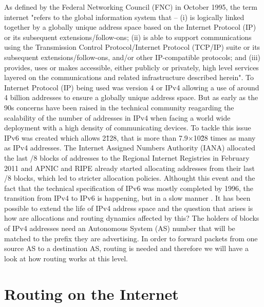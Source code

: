 \documentclass[11pt,a4paper]{scrreprt}
\begin{document}
As defined by the Federal Networking Council (FNC) in October 1995, the term internet "refers to the global information system that -- (i) is logically linked together by a globally unique address space based on the Internet Protocol (IP) or its subsequent extensions/follow-ons; (ii) is able to support communications using the Transmission Control Protocol/Internet Protocol (TCP/IP) suite or its subsequent extensions/follow-ons, and/or other IP-compatible protocols; and (iii) provides, uses or makes accessible, either publicly or privately, high level services layered on the communications and related infrastructure described herein". To Internet Protocol (IP) being used was version 4 or IPv4 allowing a use of around 4 billion addresses to ensure a globally unique address space. 
But as early as the 90s concerns have been raised in the technical community reagarding the scalability of the number of addresses in IPv4 when facing a world wide deployment with a high density of communicating devices. To tackle this issue IPv6 was created which allows 2\^128, that is more than 7.9×10\^28 times as many as IPv4 addresses. 
The Internet Assigned Numbers Authority (IANA) allocated the last /8 blocks of addresses to the Regional Internet Registries in February 2011 and APNIC and RIPE already started allocating addresses from their last /8 blocks, which led to stricter allocation policies. Althought this event and the fact that the technical specification of IPv6 was mostly completed by 1996, the transition from IPv4 to IPv6 is happening, but in a slow manner \cite{GOOGLE_IPV6}. It has been possible to extend the life of IPv4 address space and the question that arises is how are allocations and routing dynamics affected by this?
The holders of blocks of IPv4 addresses need an Autonomous System (AS) number that will be matched to the prefix they are advertising. In order to forward packets from one source AS to a destination AS, routing is needed and therefore we will have a look at how routing works at this level. 

\section{Routing on the Internet}
\end{document}
